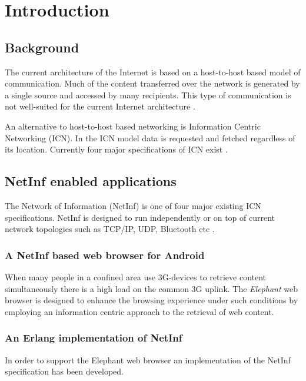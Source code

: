 \chapter{Introduction}
\section{Background}
The current architecture of the Internet is based on a host-to-host based model of communication. Much of the content transferred over the network is generated by a single source and accessed by many recipients. This type of communication is not well-suited for the current Internet architecture \cite{ICNarticle}.

An alternative to host-to-host based networking is Information Centric Networking (ICN). In the ICN model data is requested and fetched regardless of its location. Currently four major specifications of ICN exist \cite{netinf}. 

\section{NetInf enabled applications}
The Network of Information (NetInf) is one of four major existing ICN specifications. NetInf is designed to run independently or on top of current network topologies such as TCP/IP, UDP, Bluetooth etc \cite{netinfproto}.

\subsection{A NetInf based web browser for Android}
When many people in a confined area use 3G-devices to retrieve content simultaneously there is a high load on the common 3G uplink. The \textit{Elephant} web browser is designed to enhance the browsing experience under such conditions by employing an information centric approach to the retrieval of web content. 

\subsection{An Erlang implementation of NetInf}
In order to support the Elephant web browser an implementation of the NetInf specification has been developed.



